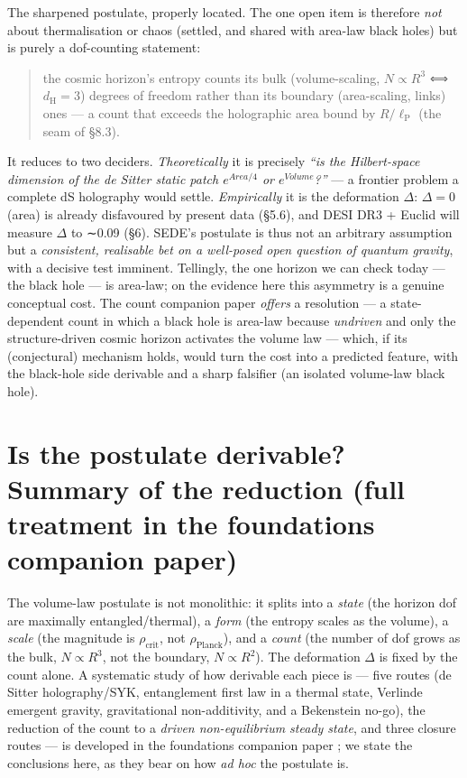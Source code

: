 \documentclass[11pt,a4paper]{article}
\begin{document}
The sharpened postulate, properly located. The one open item is
therefore \emph{not} about thermalisation or chaos (settled, and shared
with area-law black holes) but is purely a dof-counting statement:

\begin{quote}
the cosmic horizon's entropy counts its bulk (volume-scaling,
\(N \propto  R^{3}\) ⟺ \(d_{\mathrm{H}} = 3\)) degrees of freedom rather
than its boundary (area-scaling, links) ones --- a count that exceeds
the holographic area bound by \(R/\ell _{\mathrm{P}}\) (the seam of
§8.3).
\end{quote}

It reduces to two deciders. \emph{Theoretically} it is precisely
\emph{``is the Hilbert-space dimension of the de Sitter static patch
\(e^{Area/4}\) or \(e^{Volume}\)?''} --- a frontier problem a complete
dS holography would settle. \emph{Empirically} it is the deformation
\(\Delta\): \(\Delta =0\) (area) is already disfavoured by present data
(§5.6), and DESI DR3 + Euclid will measure \(\Delta\) to ∼0.09 (§6).
SEDE's postulate is thus not an arbitrary assumption but a
\emph{consistent, realisable bet on a well-posed open question of
quantum gravity}, with a decisive test imminent. Tellingly, the one
horizon we can check today --- the black hole --- is area-law; on the
evidence here this asymmetry is a genuine conceptual cost. The count
companion paper \citep{Pandev:2026count} \emph{offers} a resolution ---
a state-dependent count in which a black hole is area-law because
\emph{undriven} and only the structure-driven cosmic horizon activates
the volume law --- which, if its (conjectural) mechanism holds, would
turn the cost into a predicted feature, with the black-hole side
derivable and a sharp falsifier (an isolated volume-law black hole).

\section{Is the postulate derivable? Summary of the reduction (full
treatment in the foundations companion paper)}\label{sec-3}

The volume-law postulate is not monolithic: it splits into a
\emph{state} (the horizon dof are maximally entangled/thermal), a
\emph{form} (the entropy scales as the volume), a \emph{scale} (the
magnitude is \(\rho _{\mathrm{crit}}\), not
\(\rho _{\mathrm{Planck}}\)), and a \emph{count} (the number of dof
grows as the bulk, \(N \propto  R^{3}\), not the boundary,
\(N \propto  R^{2}\)). The deformation \(\Delta\) is fixed by the count
alone. A systematic study of how derivable each piece is --- five routes
(de Sitter holography/SYK, entanglement first law in a thermal state,
Verlinde emergent gravity, gravitational non-additivity, and a
Bekenstein no-go), the reduction of the count to a \emph{driven
non-equilibrium steady state}, and three closure routes --- is developed
in the foundations companion paper \citep{Pandev:2026foundations}; we
state the conclusions here, as they bear on how \emph{ad hoc} the
postulate is.
\end{document}
